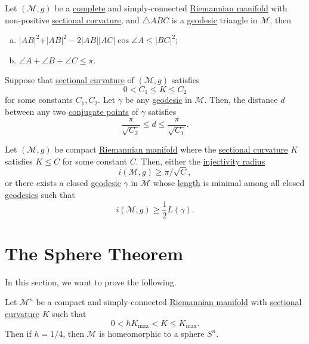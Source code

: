 \begin{corollary}
	Let \((\mathcal{M} , g )\) be a \hyperref[def:geodesically-complete]{complete} and simply-connected \hyperref[def:Riemannian-manifold]{Riemannian manifold} with non-positive \hyperref[def:sectional-curvature]{sectional curvature}, and \(\triangle ABC\) is a \hyperref[def:geodesic]{geodesic} triangle in \(\mathcal{M} \), then
	\begin{enumerate}[(a)]
		\item \(\vert AB \vert ^2 + \vert AB \vert ^2 - 2 \vert AB \vert \vert AC \vert \cos \angle A \leq \vert BC \vert ^2\);
		\item \(\angle A + \angle B + \angle C \leq \pi \).
	\end{enumerate}
\end{corollary}

\begin{corollary}
	Suppose that \hyperref[def:sectional-curvature]{sectional curvature} of \((\mathcal{M} , g)\) satisfies
	\[
		0 < C_1 \leq K \leq C_2
	\]
	for some constants \(C_1, C_2\). Let \(\gamma \) be any \hyperref[def:geodesic]{geodesic} in \(\mathcal{M} \). Then, the distance \(d\) between any two \hyperref[def:conjugate-point]{conjugate points} of \(\gamma \) satisfies
	\[
		\frac{\pi}{\sqrt{C_2} } \leq d \leq \frac{\pi }{\sqrt{C_1} }.
	\]
\end{corollary}

\begin{corollary}
	Let \((\mathcal{M} , g)\) be compact \hyperref[def:Riemannian-manifold]{Riemannian manifold} where the \hyperref[def:sectional-curvature]{sectional curvature} \(K\) satisfies \(K \leq C\) for some constant \(C\). Then, either the \hyperref[def:injectivity-radius]{injectivity radius}
	\[
		i(\mathcal{M} , g) \geq \pi / \sqrt{C},
	\]
	or there exists a closed \hyperref[def:geodesic]{geodesic} \(\gamma \) in \(\mathcal{M} \) whose \hyperref[def:length]{length} is  minimal among all closed \hyperref[def:geodesic]{geodesics} such that
	\[
		i(\mathcal{M} , g) \geq \frac{1}{2} L(\gamma ).
	\]
\end{corollary}

\section{The Sphere Theorem}
In this section, we want to prove the following.

\begin{theorem}\label{thm:sphere}
	Let \(\mathcal{M} ^n\) be a compact and simply-connected \hyperref[def:Riemannian-manifold]{Riemannian manifold} with \hyperref[def:sectional-curvature]{sectional curvature} \(K\) such that
	\[
		0 < h K_{\max } < K \leq K_{\max } .
	\]
	Then if \(h = 1 / 4\), then \(\mathcal{M} \) is homeomorphic to a sphere \(S^n\).
\end{theorem}

